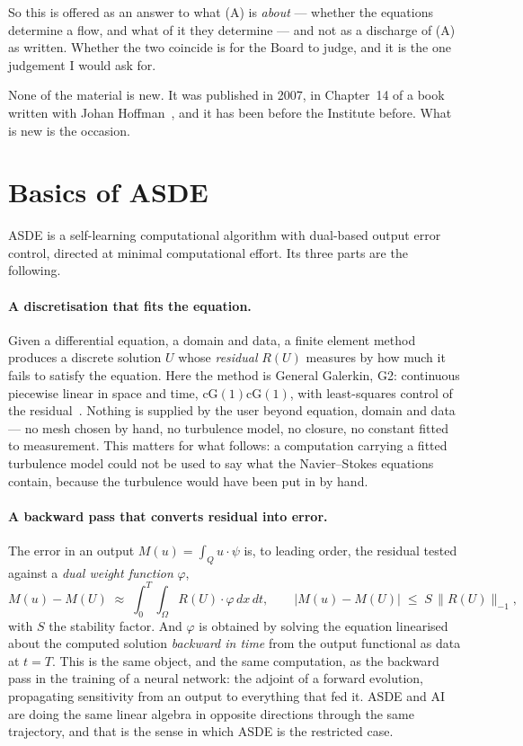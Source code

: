 \documentclass[11pt]{article}
\begin{document}
So this is offered as an answer to what (A) is \emph{about} --- whether the equations determine a
flow, and what of it they determine --- and not as a discharge of (A) as written. Whether the two
coincide is for the Board to judge, and it is the one judgement I would ask for.

None of the material is new. It was published in 2007, in Chapter~14 of a book written with Johan
Hoffman~\cite{cfd}, and it has been before the Institute before. What is new is the occasion.


\section{Basics of ASDE}\label{sec:asde}

ASDE is a self-learning computational algorithm with dual-based output error control, directed at
minimal computational effort. Its three parts are the following.

\paragraph{A discretisation that fits the equation.} Given a differential equation, a domain and
data, a finite element method produces a discrete solution $U$ whose \emph{residual} $R(U)$ measures
by how much it fails to satisfy the equation. Here the method is General Galerkin, G2: continuous
piecewise linear in space and time, $\mathrm{cG}(1)\mathrm{cG}(1)$, with least-squares control of
the residual~\cite{fehn}. Nothing is supplied by the user beyond equation, domain and data --- no
mesh chosen by hand, no turbulence model, no closure, no constant fitted to measurement. This
matters for what follows: a computation carrying a fitted turbulence model could not be used to say
what the Navier--Stokes equations contain, because the turbulence would have been put in by hand.

\paragraph{A backward pass that converts residual into error.} The error in an output $M(u)=\int_Q
u\cdot\psi$ is, to leading order, the residual tested against a \emph{dual weight function}
$\varphi$,
\begin{equation}\label{eq:dualrep}
M(u) - M(U) \;\approx\; \int_0^T\!\!\int_\Omega R(U)\cdot\varphi \,dx\,dt ,
\qquad
|M(u)-M(U)| \;\le\; S\,\|R(U)\|_{-1},
\end{equation}
with $S$ the stability factor. And $\varphi$ is obtained by solving the equation linearised about
the computed solution \emph{backward in time} from the output functional as data at $t=T$. This is
the same object, and the same computation, as the backward pass in the training of a neural
network: the adjoint of a forward evolution, propagating sensitivity from an output to everything
that fed it. ASDE and AI are doing the same linear algebra in opposite directions through the same
trajectory, and that is the sense in which ASDE is the restricted case.
\end{document}
